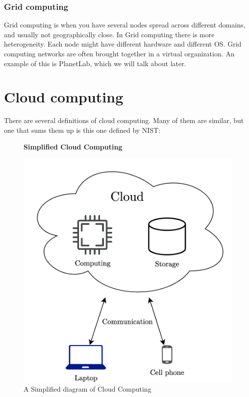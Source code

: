 \subsubsection{Grid computing}
Grid computing is when you have several nodes spread across different domains, and usually not geographically close. In Grid computing there is more heterogeneity. Each node might have different hardware and different OS. Grid computing networks are often brought together in a virtual organization. An example of this is PlanetLab, which we will talk about later. 








\section{Cloud computing}
There are several definitions of cloud computing. Many of them are similar, but one that sums them up is this one defined by NIST\cite{mell_nist_nodate}:


\begin{figure}[t]
    \centering
    \textbf{Simplified Cloud Computing}\par\medskip
    \includegraphics[scale=0.7]{chapters/background/figures/Simplified_cloud.png}
    \caption{A Simplified diagram of Cloud Computing}
    \label{fig:SimplifiedCloudDiagram}
\end{figure}

